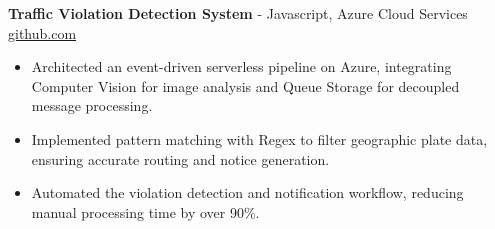 \documentclass[11pt]{article}       %
\begin{document}

\textbf{Traffic Violation Detection System}{ - Javascript, Azure Cloud Services} \hfill \href{https://github.com/Monica20030707/AWS_rekonigition-N-read-database}{github.com} \\
\vspace{-9pt}
\begin{itemize}
  \item Architected an event-driven serverless pipeline on Azure, integrating Computer Vision for image analysis and Queue Storage for decoupled message processing.
  \item Implemented pattern matching with Regex to filter geographic plate data, ensuring accurate routing and notice generation.
  \item Automated the violation detection and notification workflow, reducing manual processing time by over 90\%.
\end{itemize}
\end{document}
